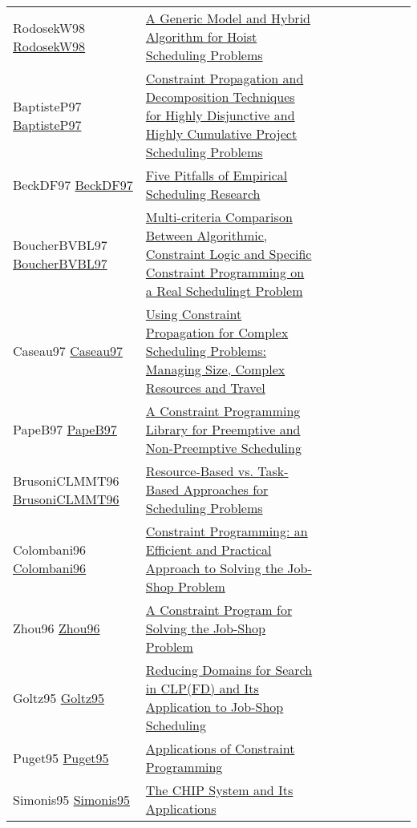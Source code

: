 {\begin{longtable}{p{3cm}p{7cm}lllllll}
RodosekW98 \href{https://doi.org/10.1007/3-540-49481-2\_28}{RodosekW98} &  \href{papers/RodosekW98.pdf}{A Generic Model and Hybrid Algorithm for Hoist Scheduling Problems} &  &  &  &  &  &  & \\
BaptisteP97 \href{https://doi.org/10.1007/BFb0017454}{BaptisteP97} &  \href{papers/BaptisteP97.pdf}{Constraint Propagation and Decomposition Techniques for Highly Disjunctive and Highly Cumulative Project Scheduling Problems} &  &  &  &  &  &  & \\
BeckDF97 \href{https://doi.org/10.1007/BFb0017455}{BeckDF97} &  \href{papers/BeckDF97.pdf}{Five Pitfalls of Empirical Scheduling Research} &  &  &  &  &  &  & \\
BoucherBVBL97 \href{}{BoucherBVBL97} &  \href{}{Multi-criteria Comparison Between Algorithmic, Constraint Logic and Specific Constraint Programming on a Real Schedulingt Problem} &  &  &  &  &  &  & \\
Caseau97 \href{https://doi.org/10.1007/BFb0017437}{Caseau97} &  \href{papers/Caseau97.pdf}{Using Constraint Propagation for Complex Scheduling Problems: Managing Size, Complex Resources and Travel} &  &  &  &  &  &  & \\
PapeB97 \href{}{PapeB97} &  \href{}{A Constraint Programming Library for Preemptive and Non-Preemptive Scheduling} &  &  &  &  &  &  & \\
BrusoniCLMMT96 \href{https://doi.org/10.1007/3-540-61286-6\_157}{BrusoniCLMMT96} &  \href{papers/BrusoniCLMMT96.pdf}{Resource-Based vs. Task-Based Approaches for Scheduling Problems} &  &  &  &  &  &  & \\
Colombani96 \href{https://doi.org/10.1007/3-540-61551-2\_72}{Colombani96} &  \href{papers/Colombani96.pdf}{Constraint Programming: an Efficient and Practical Approach to Solving the Job-Shop Problem} &  &  &  &  &  &  & \\
Zhou96 \href{https://doi.org/10.1007/3-540-61551-2\_97}{Zhou96} &  \href{papers/Zhou96.pdf}{A Constraint Program for Solving the Job-Shop Problem} &  &  &  &  &  &  & \\
Goltz95 \href{https://doi.org/10.1007/3-540-60299-2\_33}{Goltz95} &  \href{papers/Goltz95.pdf}{Reducing Domains for Search in {CLP(FD)} and Its Application to Job-Shop Scheduling} &  &  &  &  &  &  & \\
Puget95 \href{https://doi.org/10.1007/3-540-60299-2\_43}{Puget95} &  \href{papers/Puget95.pdf}{Applications of Constraint Programming} &  &  &  &  &  &  & \\
Simonis95 \href{https://doi.org/10.1007/3-540-60299-2\_42}{Simonis95} &  \href{papers/Simonis95.pdf}{The {CHIP} System and Its Applications} &  &  &  &  &  &  & \\

\end{longtable}}

